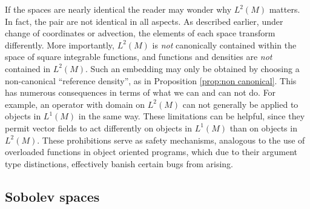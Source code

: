\documentclass[final,leqno]{siamart}
\begin{document}
If the spaces are nearly identical the reader may wonder why $L^2(M)$ matters.
In fact, the pair are not identical in all aspects.
As described earlier, under change of coordinates or advection, the elements of each space transform differently.
More importantly, $L^{2}(M)$ is \emph{not} canonically contained within the space of square integrable functions, and functions and densities are \emph{not} contained in $L^{2}(M)$.
Such an embedding may only be obtained by choosing a non-canonical ``reference density'', as in Proposition \ref{prop:non canonical}.
This has numerous consequences in terms of what we can and can not do.
For example, an operator with domain on $L^{2}(M)$ can not generally be applied to objects in $L^{1}(M)$ in the same way.
These limitations can be helpful, since they permit vector fields to act differently on objects in $L^{1}(M)$ than on objects in $L^{2}(M)$.
These prohibitions serve as safety mechanisms, analogous to the use of overloaded functions in object oriented programs, which due to their argument type distinctions, effectively banish certain bugs from arising.


\subsection{Sobolev spaces}
\label{sec:Sobolev spaces}
\end{document}
